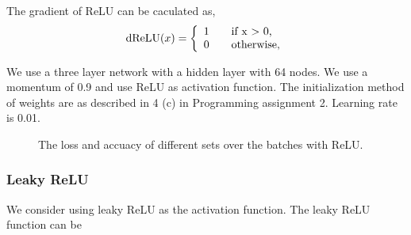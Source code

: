 \documentclass{article} %
\begin{document}
The gradient of ReLU can be caculated as,
 \[
\textnormal{dReLU}(x) =\left\{
\begin{array}{ll}
1 \qquad \textnormal{if x $>$ 0,}\\
0 \qquad \textnormal{otherwise,}
\end{array}
\right.
\]


We use a three layer network with a hidden layer with 64 nodes. We use a momentum of 0.9 and use ReLU as activation function. The initialization method of weights are as described in 4 (c) in Programming assignment 2. Learning rate is 0.01.




\begin{figure} [!htbp]
	
	\caption{The loss and accuacy of different sets over the batches with ReLU. }  
\end{figure}



\subsubsection{Leaky ReLU}

We consider using leaky ReLU as the activation function. The leaky ReLU function can be 
\end{document}
